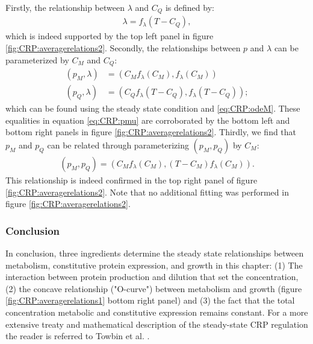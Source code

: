 %
Firstly, the relationship between $\lambda$ and $C_Q$ is defined by: 
\begin{align}
	\label{eq:CRP:muwithQ}	
	\lambda = f_\lambda(T-C_Q)
	,
\end{align}
which is indeed supported by the top left panel in figure \ref{fig:CRP:averagerelations2}.
%
Secondly, the relationships between $p$ and $\lambda$ can be parameterized by $C_M$ and $C_Q$: 
\begin{align}
	\label{eq:CRP:pmu}	
	\left(p_M, \lambda\right) & = \left(C_M f_\lambda(C_M), f_\lambda(C_M)\right) \nonumber \\ 
	\left(p_Q, \lambda\right) & = \left(C_Q f_\lambda(T-C_Q), f_\lambda(T-C_Q)\right)
	;
\end{align}
which can be found using the steady state condition and \ref{eq:CRP:odeM}. These equalities in equation \ref{eq:CRP:pmu} are corroborated by the bottom left and bottom right panels in figure \ref{fig:CRP:averagerelations2}.
%
Thirdly, we find that $p_M$ and $p_Q$ can be related through parameterizing $(p_M, p_Q)$ by $C_M$:
%
\begin{align}
	\label{eq:CRP:pMpQ}	
	\left(p_M, p_Q\right) = 
	\left(C_M f_\lambda(C_M), (T-C_M) f_\lambda(C_M)\right)
	.
\end{align}
This relationship is indeed confirmed in the top right panel of figure \ref{fig:CRP:averagerelations2}.
%
Note that no additional fitting was performed in figure \ref{fig:CRP:averagerelations2}.

\subsubsection*{Conclusion}

In conclusion, three ingredients determine the steady state relationships between metabolism, constitutive protein expression, and growth in this chapter: 
(1) The interaction between protein production and dilution that set the concentration, 
(2) the concave relationship ("O-curve") between metabolism and growth (figure \ref{fig:CRP:averagerelations1} bottom right panel) and
(3) the fact that the total concentration metabolic and constitutive expression remains constant.
%
For a more extensive treaty and mathematical description of the steady-state CRP regulation the reader is referred to Towbin et al. \cite{Towbin2017}.
%



